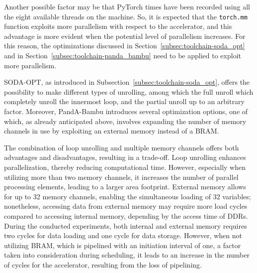 Another possible factor may be that PyTorch times have been recorded using all the eight available threads on the machine.
So, it is expected that the \lstinline{torch.mm} function exploits more parallelism with respect to the accelerator, and this advantage is more evident when the potential level of parallelism increases.
For this reason, the optimizations discussed in Section~\ref{subsec:toolchain-soda_opt} and in Section~\ref{subsec:toolchain-panda_bambu} need to be applied to exploit more parallelism.

SODA-OPT, as introduced in Subsection~\ref{subsec:toolchain-soda_opt}, offers the possibility to make different types of unrolling, among which the full unroll which completely unroll the innermost loop, and the partial unroll up to an arbitrary factor.
Moreover, PandA-Bambu introduces several optimization options, one of which, as already anticipated above, involves expanding the number of memory channels in use by exploiting an external memory instead of a BRAM\@.

The combination of loop unrolling and multiple memory channels offers both advantages and disadvantages, resulting in a trade-off.
Loop unrolling enhances parallelization, thereby reducing computational time.
However, especially when utilizing more than two memory channels, it increases the number of parallel processing elements, leading to a larger area footprint.
External memory allows for up to 32 memory channels, enabling the simultaneous loading of 32 variables; nonetheless, accessing data from external memory may require more load cycles compared to accessing internal memory, depending by the access time of DDRs.
During the conducted experiments, both internal and external memory requires two cycles for data loading and one cycle for data storage.
However, when not utilizing BRAM, which is pipelined with an initiation interval of one, a factor taken into consideration during scheduling, it leads to an increase in the number of cycles for the accelerator, resulting from the loss of pipelining.

